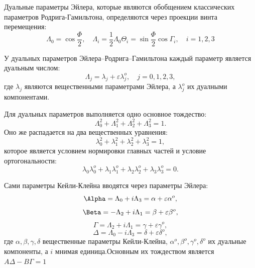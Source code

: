 Дуальные параметры Эйлера, которые являются обобщением классических параметров Родрига-Гамильтона, определяются через проекции винта перемещения:
\begin{equation*}
    \Lambda_0 = \cos \frac{\Phi}{2}, \quad \Lambda_i = \frac{1}{2} \Lambda_0 \Theta_i = \sin \frac{\Phi}{2} \cos \Gamma_i, \quad i = 1, 2, 3
\end{equation*}



У дуальных параметров Эйлера–Родрига–Гамильтона каждый параметр является дуальным числом:
\begin{equation*}
    \Lambda_j = \lambda_j + \varepsilon \lambda_j^o, \quad j = 0, 1, 2, 3,
\end{equation*}
где $\lambda_j$ являются вещественными параметрами Эйлера, а $\lambda_j^o$ их дуалными компонентами.

Для дуальных параметров выполняется одно основное тождество:
\begin{equation*}
    \Lambda_0^2 + \Lambda_1^2 + \Lambda_2^2 + \Lambda_3^2 = 1.
\end{equation*}
Оно же распадается на два вещественных уравнения:
\begin{equation*}
    \lambda_0^2 + \lambda_1^2 + \lambda_2^2 + \lambda_3^2 = 1,
\end{equation*}
которое является условием нормировки главных частей и условие ортогональности:
\begin{equation*}
    \lambda_0 \lambda_0^o + \lambda_1 \lambda_1^o + \lambda_2 \lambda_2^o + \lambda_3 \lambda_3^o = 0.
\end{equation*}

Сами параметры Кейли-Клейна вводятся через параметры Эйлера:
\begin{equation*}
    \Alpha = \Lambda_0 + i\Lambda_3 = \alpha + \varepsilon \alpha^o,
\end{equation*}
\begin{equation*}
    \Beta = -\Lambda_2 + i\Lambda_1 = \beta + \varepsilon \beta^o,
\end{equation*}
\begin{equation*}
    \Gamma = \Lambda_2 + i\Lambda_1 = \gamma + \varepsilon \gamma^o,
\end{equation*}
\begin{equation*}
    \Delta = \Lambda_0 - i\Lambda_3 = \delta + \varepsilon \delta^o,
\end{equation*}
где $\alpha, \beta, \gamma, \delta$ вещественные параметры Кейли-Клейна, $\alpha^o, \beta^o, \gamma^o, \delta^o$ их дуальные компоненты, а $i$ мнимая единица.Основным их тождеством является $A\Delta - B\Gamma = 1$

